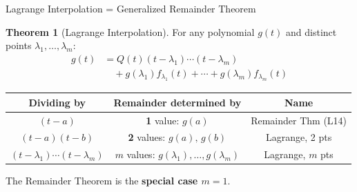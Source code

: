 \documentclass[10pt]{beamer}
\theoremstyle{definition}
\newtheorem{thm}{Theorem}[section]
\newcommand{\x}[1]{\alert{\textbf{#1}}}
\begin{document}
%
\begin{frame}[shrink=5]{Lagrange Interpolation = Generalized Remainder Theorem}

\begin{thm}[Lagrange Interpolation]
For any polynomial $g(t)$ and distinct points $\lambda_1, \ldots, \lambda_m$:
\begin{align*}
g(t) &= Q(t)(t\!-\!\lambda_1)\cdots(t\!-\!\lambda_m)\\
     &\quad + g(\lambda_1)f_{\lambda_1}(t) + \cdots + g(\lambda_m)f_{\lambda_m}(t)
\end{align*}
\end{thm}

\vfill

\begin{center}
\small
\renewcommand{\arraystretch}{1.5}
\begin{tabular}{c|c|c}
\textbf{Dividing by} & \textbf{Remainder determined by} & \textbf{Name} \\
\hline
$(t - a)$ & \x{1} value: $g(a)$ & Remainder Thm (L14) \\
$(t-a)(t-b)$ & \x{2} values: $g(a),\, g(b)$ & Lagrange, 2 pts \\
$(t-\lambda_1)\cdots(t-\lambda_m)$ & \x{$m$} values: $g(\lambda_1),\ldots,g(\lambda_m)$ & Lagrange, $m$ pts
\end{tabular}
\end{center}

\vfill

The Remainder Theorem is the \x{special case $m = 1$}.

\end{frame}
\end{document}
